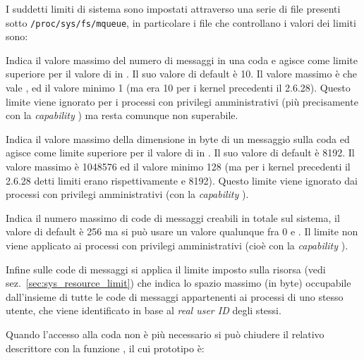 I suddetti limiti di sistema sono impostati attraverso una serie di file
presenti sotto \texttt{/proc/sys/fs/mqueue}, in particolare i file che
controllano i valori dei limiti sono:
\begin{basedescript}{\desclabelwidth{1.5cm}\desclabelstyle{\nextlinelabel}}
\item[\sysctlfiled{fs/mqueue/msg\_max}] Indica il valore massimo del numero di
  messaggi in una coda e agisce come limite superiore per il valore di
   in . Il suo valore di default è 10. Il
  valore massimo è  che vale ,
  ed il valore minimo 1 (ma era 10 per i kernel precedenti il 2.6.28). Questo
  limite viene ignorato per i processi con privilegi amministrativi (più
  precisamente con la \textit{capability} ) ma
   resta comunque non superabile.

\item[\sysctlfiled{fs/mqueue/msgsize\_max}] Indica il valore massimo della
  dimensione in byte di un messaggio sulla coda ed agisce come limite
  superiore per il valore di  in . Il
  suo valore di default è 8192.  Il valore massimo è 1048576 ed il valore
  minimo 128 (ma per i kernel precedenti il 2.6.28 detti limiti erano
  rispettivamente  e 8192). Questo limite viene ignorato dai
  processi con privilegi amministrativi (con la \textit{capability}
  ).

\item[\sysctlfiled{fs/mqueue/queues\_max}] Indica il numero massimo di code di
  messaggi creabili in totale sul sistema, il valore di default è 256 ma si
  può usare un valore qualunque fra $0$ e . Il limite non
  viene applicato ai processi con privilegi amministrativi (cioè con la
  \textit{capability} ).

\end{basedescript}

Infine sulle code di messaggi si applica il limite imposto sulla risorsa
 (vedi sez.~\ref{sec:sys_resource_limit}) che indica
lo spazio massimo (in byte) occupabile dall'insieme di tutte le code di
messaggi appartenenti ai processi di uno stesso utente, che viene identificato
in base al \textit{real user ID} degli stessi.

Quando l'accesso alla coda non è più necessario si può chiudere il relativo
descrittore con la funzione , il cui prototipo è:

